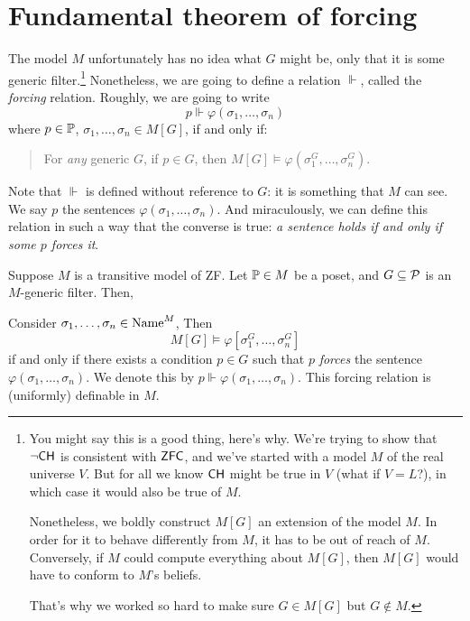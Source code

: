 \section{Fundamental theorem of forcing}
The model $M$ unfortunately has no idea what $G$ might be,
only that it is some generic filter.\footnote{%
	You might say this is a good thing, here's why.
	We're trying to show that $\neg \mathsf{CH}$ is consistent with $\mathsf{ZFC}$,
	and we've started with a model $M$ of the real universe $V$.
	But for all we know $\mathsf{CH}$ might be true in $V$ (what if $V=L$?),
	in which case it would also be true of $M$.

	Nonetheless, we boldly construct $M[G]$ an extension of the model $M$.
	In order for it to behave differently from $M$, it has to be out of reach of $M$.
	Conversely, if $M$ could compute everything about $M[G]$,
	then $M[G]$ would have to conform to $M$'s beliefs.

	That's why we worked so hard to make sure $G \in M[G]$ but $G \notin M$.
}
Nonetheless, we are going to define a relation $\Vdash$, called the \emph{forcing} relation.
Roughly, we are going to write
\[ p \Vdash \varphi(\sigma_1, \dots, \sigma_n) \]
where $p \in \mathbb P$, $\sigma_1, \dots, \sigma_n \in M[G]$, if and only if:
\begin{quote}
	For \emph{any} generic $G$,
	if $p \in G$,
	then $M[G] \vDash \varphi(\sigma_1^G, \dots, \sigma_n^G)$.
\end{quote}
Note that $\Vdash$ is defined without reference to $G$:
it is something that $M$ can see.
We say $p$  the sentences $\varphi(\sigma_1, \dots, \sigma_n)$.
And miraculously, we can define this relation in such a way that the converse is true:
\emph{a sentence holds if and only if some $p$ forces it}.


\begin{theorem}
	Suppose $M$ is a transitive model of ZF.
	Let $\mathbb P \in M$ be a poset, and $G \subseteq \mathcal P$ is an $M$-generic filter.
	Then,
	\begin{enumerate}[(1)]
		\ii Consider $\sigma_1, \dots, \sigma_n \in \text{Name}^M$,
		Then
		\[ M[G] \vDash \varphi[\sigma_1^G, \dots, \sigma_n^G] \]
		if and only if there exists a condition $p \in G$
		such that $p$ \emph{forces} the sentence $\varphi(\sigma_1, \dots, \sigma_n)$.
		We denote this by $p \Vdash \varphi(\sigma_1, \dots, \sigma_n)$.
		\ii This forcing relation is (uniformly) definable in $M$.
	\end{enumerate}
\end{theorem}

